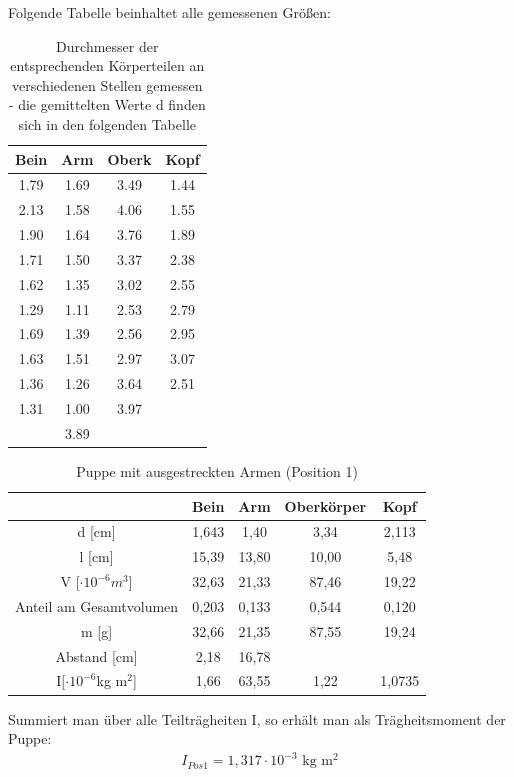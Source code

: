 Folgende Tabelle beinhaltet alle gemessenen Größen:
\begin{table}[H]
\begin{tabular}{|c|c|c|c|}
\hline 
Bein&	Arm	&Oberk	&Kopf	\\ \hline
1.79&	1.69&	3.49&	1.44\\ \hline
2.13&	1.58&	4.06&	1.55\\ \hline
1.90&	1.64&	3.76&	1.89\\ \hline
1.71&	1.50&	3.37&	2.38\\ \hline
1.62&	1.35&	3.02&	2.55\\ \hline
1.29&	1.11&	2.53&	2.79\\ \hline
1.69&	1.39&	2.56&	2.95\\ \hline
1.63&	1.51&	2.97&	3.07\\ \hline
1.36&	1.26&	3.64&	2.51\\ \hline
1.31&	1.00&	3.97&		\\ \hline
	&	3.89&		&		\\ \hline
\end{tabular}
\caption{Durchmesser der entsprechenden Körperteilen an verschiedenen Stellen gemessen - die gemittelten Werte d finden sich in den folgenden Tabelle}
\end{table}
\begin{table}[htbp]
\begin{tabular}{|c|c|c|c|c|}
\hline 		
&	Bein&	Arm	&Oberkörper	&Kopf	\\ \hline	
d [cm]&	1,643&	1,40&	3,34&	2,113\\ \hline				
l [cm] &	15,39	&13,80	&10,00	&5,48\\ \hline	
					
V [$\cdot 10^{-6} m^3$]	&32,63	&21,33	&87,46	&19,22	\\ \hline	
Anteil am Gesamtvolumen	&0,203	&0,133	&0,544	&0,120	\\ \hline		
m [g]	&32,66	&21,35	&87,55 &19,24\\ \hline
Abstand [cm]	&2,18	&16,78	&&\\ \hline	
					
I[$\cdot 10^{-6}$kg m$^2$]&		 1,66	&63,55&	1,22	&1,0735\\ \hline	
\end{tabular} 
\caption{Puppe mit ausgestreckten Armen (Position 1)}
\end{table}

Summiert man über alle Teilträgheiten I, so erhält man als Trägheitsmoment der Puppe:
\begin{align*}
I_{Pos 1}= 1,317\cdot 10^{-3}\text{ kg m$^2$}
\end{align*}

